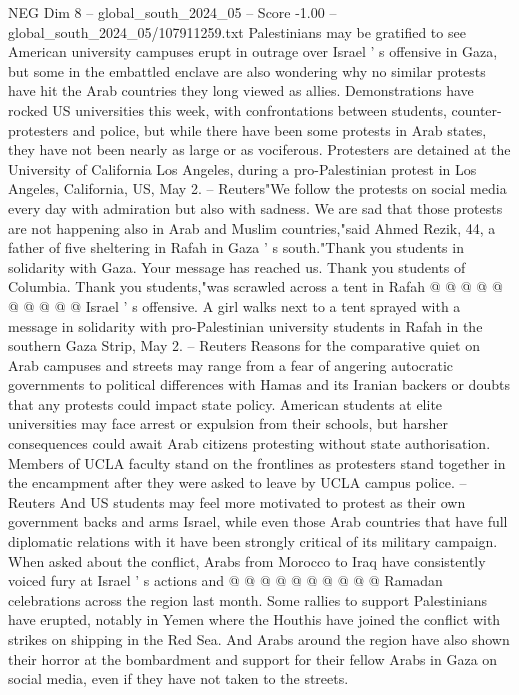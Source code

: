 \begin{textsample}{NEG Dim 8 – global\_south\_2024\_05 – Score -1.00 – global\_south\_2024\_05/107911259.txt}  \label{ex:f8_neg_101}
Palestinians may be gratified to see American university campuses erupt in outrage over Israel ' s offensive in Gaza, but some in the embattled enclave are also wondering why no similar protests have hit the Arab countries they long viewed as allies.
Demonstrations have rocked US universities this week, with confrontations between students, counter-protesters and police, but while there have been some protests in Arab states, they have not been nearly as large or as vociferous.
Protesters are detained at the University of California Los Angeles, during a pro-Palestinian protest in Los Angeles, California, US, May 2. -- Reuters"We follow the protests on social media every day with admiration but also with sadness.
We are sad that those protests are not happening also in Arab and Muslim countries,"said Ahmed Rezik, 44, a father of five sheltering in Rafah in Gaza ' s south."Thank you students in solidarity with Gaza.
Your message has reached us.
Thank you students of Columbia.
Thank you students,"was scrawled across a tent in Rafah @ @ @ @ @ @ @ @ @ @ Israel ' s offensive.
A girl walks next to a tent sprayed with a message in solidarity with pro-Palestinian university students in Rafah in the southern Gaza Strip, May 2. -- Reuters Reasons for the comparative quiet on Arab campuses and streets may range from a fear of angering autocratic governments to political differences with Hamas and its Iranian backers or doubts that any protests could impact state policy.
American students at elite universities may face arrest or expulsion from their schools, but harsher consequences could await Arab citizens protesting without state authorisation.
Members of UCLA faculty stand on the frontlines as protesters stand together in the encampment after they were asked to leave by UCLA campus police. -- Reuters And US students may feel more motivated to protest as their own government backs and arms Israel, while even those Arab countries that have full diplomatic relations with it have been strongly critical of its military campaign.
When asked about the conflict, Arabs from Morocco to Iraq have consistently voiced fury at Israel ' s actions and @ @ @ @ @ @ @ @ @ @ Ramadan celebrations across the region last month.
Some rallies to support Palestinians have erupted, notably in Yemen where the Houthis have joined the conflict with strikes on shipping in the Red Sea.
And Arabs around the region have also shown their horror at the bombardment and support for their fellow Arabs in Gaza on social media, even if they have not taken to the streets.

\end{textsample}

